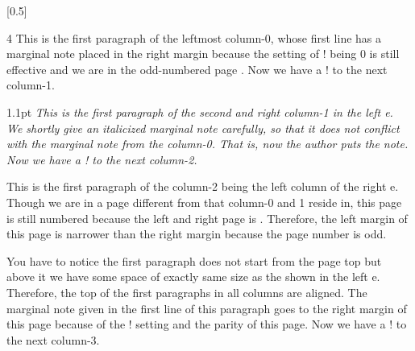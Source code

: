  [0.5]
 \par\Hrule
 \begin{paracol}[2]{4}
 This is the first paragraph of the leftmost column-0,
 whose first line has a marginal note placed in the right margin because
 the setting of \!\marginparthreshold! being 0 is still effective and we
 are in the odd-numbered page \pageref{sec:ppts-paired}.  Now we
 have a \!\switchcolumn! to the next column-1.
 
 \switchcolumn
 \begin{Hfuzz}{1.1pt}\it
 This is the first paragraph of the second and right column-1 in the left
 \parapag{}e.  We shortly give an italicized mar\-gin\-al note carefully, so
 that it does not conflict with the marginal note from the column-0.
 That is, now the author puts the note.  Now we
 have a \!\switchcolumn! to the next column-2.
 \end{Hfuzz}
 
 \switchcolumn
 \begingroup\sf
 This is the first paragraph of the column-2 being the left column of the
 right \parapag{}e.  Though we are in a page different from that column-0
 and 1 reside in, this page is still numbered \pageref{sec:ppts-paired}
 because the left and right page is \paired.  Therefore, the left margin of
 this page is narrower than the right margin because the page number is
 odd.
 
 
 You have to notice
 the first paragraph does not start from the page top
 but above it we have some space of exactly same size as the \preenv{}
 shown in the left \parapag{}e.  Therefore, the top of the first paragraphs
 in all columns are aligned.  The marginal note given in the first line of
 this paragraph goes to the right margin of this page because of the
 \!\marginparthreshold! setting and the parity of this page.  Now we have a
 \!\switchcolumn! to the next column-3.
 \par\endgroup
 

\end{paracol}
